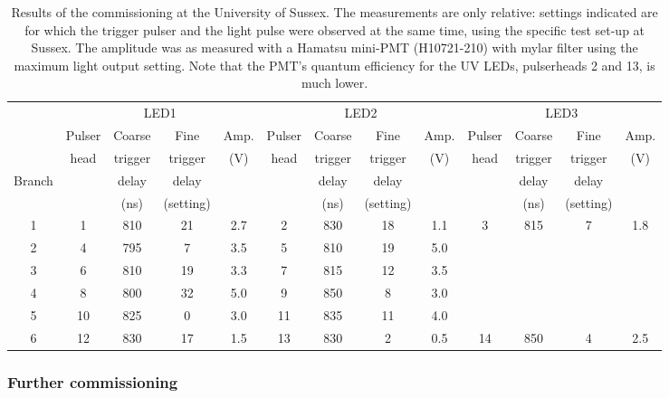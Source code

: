 \begin{table}[h!]
  \begin{center}
    \caption{Results of the commissioning at the University of Sussex. The measurements are only relative: settings indicated are for which the trigger pulser and the light pulse were observed at the same time, using the specific test set-up at Sussex. The amplitude was as measured with a Hamatsu mini-PMT (H10721-210) with mylar filter using the maximum light output setting. Note that the PMT's quantum efficiency for the UV LEDs, pulserheads 2 and 13, is much lower.}
    \label{table:sussex_commissioning}
    \begin{tabular}{|c|c|c|c|c|c|c|c|c|c|c|c|c|} 
	\hline
	 & \multicolumn{4}{c|}{LED1} & \multicolumn{4}{c|}{LED2} & \multicolumn{4}{c|}{LED3} \\
	\cline{2-13}
		        & Pulser & Coarse   & Fine   & Amp.
		        & Pulser & Coarse   & Fine   & Amp.
		        & Pulser & Coarse   & Fine   & Amp. \\
	              & head    & trigger & trigger & (V) 
			 & head    & trigger & trigger & (V) 
                    & head    & trigger & trigger & (V) \\
	Branch    & & delay & delay & & & delay & delay & & & delay & delay & \\
	             & & (ns) & (setting) & & & (ns) & (setting) & & & (ns) & (setting) & \\
       \hline 
	1 & 1 & 810 & 21 & 2.7 & 2 & 830 & 18 & 1.1 & 3 & 815 & 7 & 1.8 \\
	2 & 4 & 795 & 7  & 3.5 & 5 & 810 & 19 & 5.0 & & & & \\
	3 & 6 & 810 & 19 & 3.3 & 7 & 815 & 12 & 3.5 & & & & \\
	4 & 8 & 800 & 32 & 5.0 & 9 & 850 & 8 & 3.0 & & & & \\
	5 & 10 & 825 & 0 & 3.0 & 11 & 835 & 11 & 4.0 & & & & \\
	6 & 12 & 830 & 17 & 1.5 & 13 & 830 & 2 & 0.5 & 14 & 850 & 4 & 2.5 \\
	\hline
    \end{tabular}
  \end{center}
\end{table}

\subsubsection*{Further commissioning}

